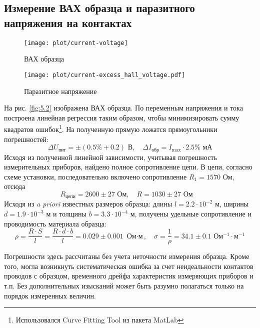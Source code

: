\documentclass[a4paper,14pt]{extarticle}
\begin{document}
\subsection{Измерение ВАХ образца и паразитного напряжения на контактах}

\begin{figure}[h!]
\begin{minipage}[h]{0.49\linewidth}
	\centering
	\texttt{[image: plot/current-voltage]}
	\caption{ВАХ образца}
	\label{fig:5.2}
\end{minipage}
\hfill
\begin{minipage}[h]{0.49\linewidth}
	\centering
	\texttt{[image: plot/current-excess\_hall\_voltage.pdf]}
	\caption{Паразитное напряжение}
	\label{fig:5.3}
\end{minipage}
\end{figure}

На рис. \ref{fig:5.2} изображена ВАХ образца. По переменным напряжения и тока построена линейная регрессия таким образом, чтобы минимизировать сумму квадратов ошибок\footnote{Использовался Curve Fitting Tool из пакета MatLab}. На полученную прямую ложатся прямоугольники погрешностей:
\begin{equation}
	\Delta U_\text{пит} = \pm (0.5\%+0.2) \text{ В}, \quad
	\Delta I_\text{обр} = I_{\max}\cdot 2.5\% \text{ мА}
\end{equation}
Исходя из полученной линейной зависимости, учитывая погрешность измерительных приборов, найдено полное сопротивление цепи. В цепи, согласно схеме установки, последовательно включено сопротивление $R_1=1570$ Ом, отсюда
\begin{equation}
	R_\text{цепи}=2600\pm27 \text{ Ом}, \quad
	R=1030\pm27 \text{ Ом} \quad
\end{equation}
Исходя из \textit{a priori} известных размеров образца: длины $l=2.2\cdot 10^{-2}$ м, ширины  $d=1.9\cdot 10^{-3}$ м и толщины $b=3.3\cdot 10^{-4} $ м, получены удельные сопротивление и проводимость материала образца:
\begin{equation}
	\rho=\frac{R\cdot S}{l}=\frac{R\cdot d \cdot b}{l}=
	0.029\pm 0.001 \text{ Ом$\cdot$м}, \quad
%
	\sigma=\frac{1}{\rho}=34.1\pm0.1 \text{ Ом$^{-1}\cdot$м$^{-1}$}
\end{equation}

Погрешности здесь рассчитаны без учета неточности измерения образца. 
Кроме того, могла возникнуть систематическая ошибка за счет 
неидеальности контактов проводов с образцом, временного дрейфа 
характеристик измеряющих приборов и т.п. Без дополнительных
изысканий может быть разумно полагаться только на порядок измеренных величин.  
\end{document}
